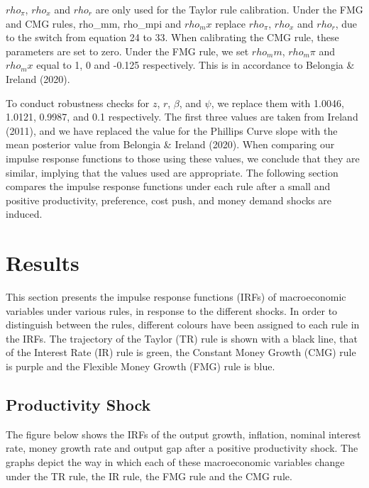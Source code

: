 \documentclass[11pt,preprint, authoryear]{elsarticle}
\numberwithin{equation}{section}
\numberwithin{figure}{section}
\numberwithin{table}{section}
\begin{document}
\(rho_\pi\), \(rho_x\) and \(rho_r\) are only used for the Taylor rule
calibration. Under the FMG and CMG rules, rho\_mm, rho\_mpi and
\(rho_mx\) replace \(rho_\pi\), \(rho_x\) and \(rho_r\), due to the
switch from equation 24 to 33. When calibrating the CMG rule, these
parameters are set to zero. Under the FMG rule, we set \(rho_mm\),
\(rho_m\pi\) and \(rho_mx\) equal to 1, 0 and -0.125 respectively. This
is in accordance to Belongia \& Ireland (2020).

To conduct robustness checks for \(z\), \(r\), \(\beta\), and \(\psi\),
we replace them with 1.0046, 1.0121, 0.9987, and 0.1 respectively. The
first three values are taken from Ireland (2011), and we have replaced
the value for the Phillips Curve slope with the mean posterior value
from Belongia \& Ireland (2020). When comparing our impulse response
functions to those using these values, we conclude that they are
similar, implying that the values used are appropriate. The following
section compares the impulse response functions under each rule after a
small and positive productivity, preference, cost push, and money demand
shocks are induced.

\newpage

\hypertarget{results}{%
\section{Results}\label{results}}

This section presents the impulse response functions (IRFs) of
macroeconomic variables under various rules, in response to the
different shocks. In order to distinguish between the rules, different
colours have been assigned to each rule in the IRFs. The trajectory of
the Taylor (TR) rule is shown with a black line, that of the Interest
Rate (IR) rule is green, the Constant Money Growth (CMG) rule is purple
and the Flexible Money Growth (FMG) rule is blue.

\hypertarget{productivity-shock}{%
\subsection{Productivity Shock}\label{productivity-shock}}

The figure below shows the IRFs of the output growth, inflation, nominal
interest rate, money growth rate and output gap after a positive
productivity shock. The graphs depict the way in which each of these
macroeconomic variables change under the TR rule, the IR rule, the FMG
rule and the CMG rule.
\end{document}
